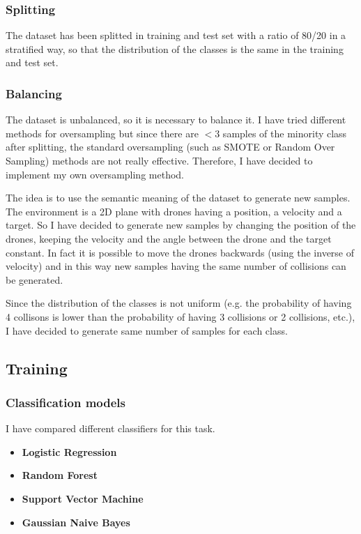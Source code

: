 \subsubsection{Splitting}
\label{sec:preprocessing-splitting}
The dataset has been splitted in training and test set with a ratio of 80/20 in a stratified way, so that the distribution of the classes is the same in the training and test set.

\subsubsection{Balancing}
\label{sec:preprocessing-balancing}
The dataset is unbalanced, so it is necessary to balance it.
I have tried different methods for oversampling but since there are $<3$ samples of the minority class after splitting, the standard oversampling (such as SMOTE or Random Over Sampling) methods are not really effective.
Therefore, I have decided to implement my own oversampling method.

The idea is to use the semantic meaning of the dataset to generate new samples.
The environment is a 2D plane with drones having a position, a velocity and a target.
So I have decided to generate new samples by changing the position of the drones, keeping the velocity and the angle between the drone and the target constant.
In fact it is possible to move the drones backwards (using the inverse of velocity) and in this way new samples having the same number of collisions can be generated.

Since the distribution of the classes is not uniform (e.g. the probability of having 4 collisons is lower than the probability of having 3 collisions or 2 collisions, etc.), I have decided to generate same number of samples for each class.

\subsection{Training}
\label{sec:training}

\subsubsection{Classification models}
\label{sec:training-classifier-selection}
I have compared different classifiers for this task.
\begin{itemize}
    \item \textbf{Logistic Regression}
    \item \textbf{Random Forest}
    \item \textbf{Support Vector Machine}
    \item \textbf{Gaussian Naive Bayes}
\end{itemize}



